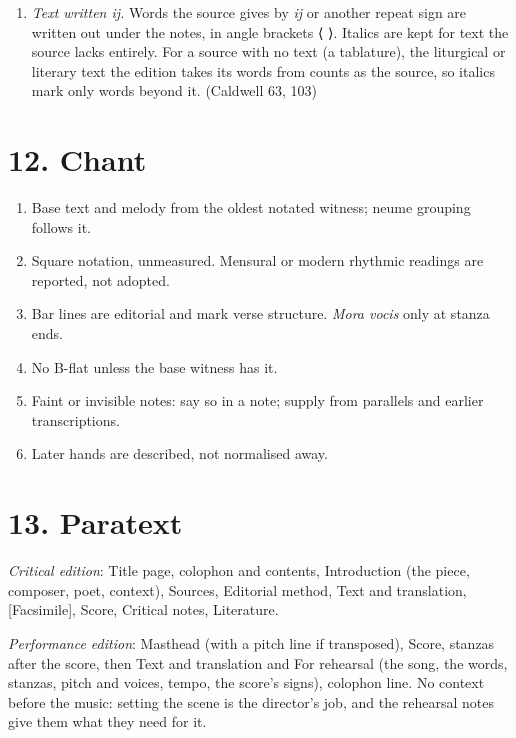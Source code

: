 \begin{enumerate}
\item
  \textit{Text written \emph{ij}.} Words the source gives by \emph{ij} or another repeat sign are written out under the notes, in angle brackets ⟨ ⟩. Italics are kept for text the source lacks entirely. For a source with no text (a tablature), the liturgical or literary text the edition takes its words from counts as the source, so italics mark only words beyond it. (Caldwell 63, 103)
\end{enumerate}

\section*{12. Chant}

\begin{enumerate}

\tightlist
\item
  Base text and melody from the oldest notated witness; neume grouping follows it.
\item
  Square notation, unmeasured. Mensural or modern rhythmic readings are reported, not adopted.
\item
  Bar lines are editorial and mark verse structure. \emph{Mora vocis} only at stanza ends.
\item
  No B-flat unless the base witness has it.
\item
  Faint or invisible notes: say so in a note; supply from parallels and earlier transcriptions.
\item
  Later hands are described, not normalised away.
\end{enumerate}

\section*{13. Paratext}

\textit{Critical edition}: Title page, colophon and contents, Introduction (the piece, composer, poet, context), Sources, Editorial method, Text and translation, {[}Facsimile{]}, Score, Critical notes, Literature.

\textit{Performance edition}: Masthead (with a pitch line if transposed), Score, stanzas after the score, then Text and translation and For rehearsal (the song, the words, stanzas, pitch and voices, tempo, the score's signs), colophon line. No context before the music: setting the scene is the director's job, and the rehearsal notes give them what they need for it.

